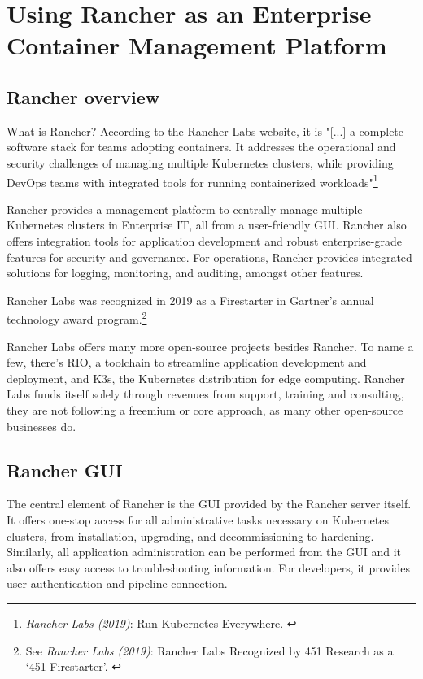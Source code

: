 %
%

\pagebreak
\section{Using Rancher as an Enterprise Container Management Platform}

\onehalfspacing

\subsection{Rancher overview}

What is Rancher? According to the Rancher Labs website, it is "[...] a complete software stack for teams adopting containers. It addresses the operational and security challenges of managing multiple Kubernetes clusters, while providing DevOps teams with integrated tools for running containerized workloads"\footnote{\textit{Rancher Labs (2019)}: Run Kubernetes Everywhere. \cite{rancher}}

Rancher provides a management platform to centrally manage multiple Kubernetes clusters in Enterprise IT, all from a user-friendly GUI. Rancher also offers integration tools for application development and robust enterprise-grade features for security and governance. For operations, Rancher provides integrated solutions for logging, monitoring, and auditing, amongst other features.

Rancher Labs was recognized in 2019 as a Firestarter in Gartner's annual technology award program.\footnote{See \textit{Rancher Labs (2019)}: Rancher Labs Recognized by 451 Research as a ‘451 Firestarter’. \cite{firestarter451}}

Rancher Labs offers many more open-source projects besides Rancher. To name a few, there's RIO, a toolchain to streamline application development and deployment, and K3s, the Kubernetes distribution for edge computing. Rancher Labs funds itself solely through revenues from support, training and consulting, they are not following a freemium or core approach, as many other open-source businesses do.

\subsection{Rancher GUI}

The central element of Rancher is the GUI provided by the Rancher server itself. It offers one-stop access for all administrative tasks necessary on Kubernetes clusters, from installation, upgrading, and decommissioning to hardening. Similarly, all application administration can be performed from the GUI and it also offers easy access to troubleshooting information. For developers, it provides user authentication and pipeline connection.

